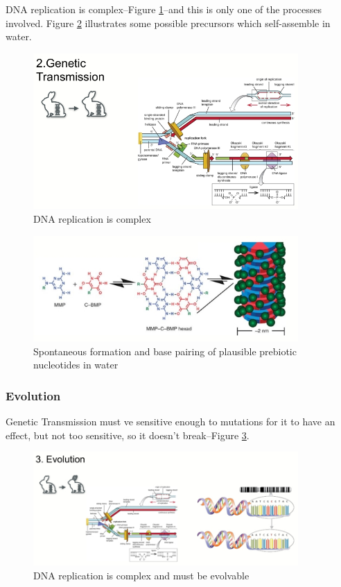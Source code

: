 \documentclass[]{article}
\begin{document}
DNA replication is complex--Figure \ref{fig:DNA_replication_complex}--and this is only one of the processes involved. Figure \ref{fig:SpontaneousFormation}\cite{cafferty2016spontaneous} illustrates some possible precursors which self-assemble in water. 
\begin{figure}[H]
	\caption{DNA replication is complex}\label{fig:DNA_replication_complex}
	\includegraphics[width=0.9\textwidth]{DNA_replication_complex}
\end{figure}

\begin{figure}[H]
	\caption[Spontaneous formation and base pairing]{Spontaneous formation and base pairing of plausible prebiotic nucleotides in water}\label{fig:SpontaneousFormation}
	\includegraphics[width=0.9\textwidth]{SpontaneousFormation}
\end{figure}

\subsubsection{Evolution}

Genetic Transmission must ve sensitive enough to mutations for it to have an effect, but not too sensitive, so it doesn't break--Figure \ref{fig:EvolutionOfEvolution}.
\begin{figure}[H]
	\caption{DNA replication is complex and must be evolvable}\label{fig:EvolutionOfEvolution}
	\includegraphics[width=0.9\textwidth]{EvolutionOfEvolution}
\end{figure}
\end{document}
